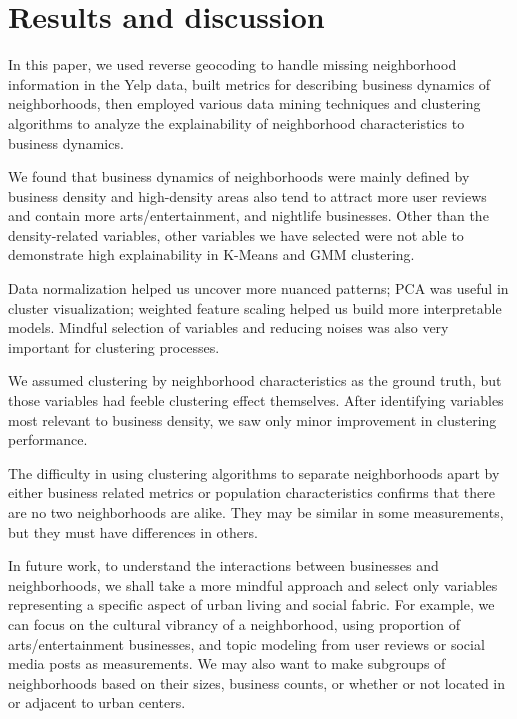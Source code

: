 \documentclass[compsoc]{IEEEtran}
\begin{document}
\section{Results and discussion}

In this paper, we used reverse geocoding to handle missing neighborhood information in the Yelp data, built metrics for describing business dynamics of neighborhoods, then employed various data mining techniques and clustering algorithms to analyze the explainability of neighborhood characteristics to business dynamics.

We found that business dynamics of neighborhoods were mainly defined by business density and high-density areas also tend to attract more user reviews and contain more arts/entertainment, and nightlife businesses. Other than the density-related variables, other variables we have selected were not able to demonstrate high explainability in K-Means and GMM clustering.

Data normalization helped us uncover more nuanced patterns; PCA was useful in cluster visualization; weighted feature scaling helped us build more interpretable models. Mindful selection of variables and reducing noises was also very important for clustering processes.

 We assumed clustering by neighborhood characteristics as the ground truth, but those variables had feeble clustering effect themselves. After identifying variables most relevant to business density, we saw only minor improvement in clustering performance.

The difficulty in using clustering algorithms to separate neighborhoods apart by either business related metrics or population characteristics confirms that there are no two neighborhoods are alike. They may be similar in some measurements, but they must have differences in others.

In future work, to understand the interactions between businesses and neighborhoods, we shall take a more mindful approach and select only variables representing a specific aspect of urban living and social fabric. For example, we can focus on the cultural vibrancy of a neighborhood, using proportion of arts/entertainment businesses, and topic modeling from user reviews or social media posts as measurements. We may also want to make subgroups of neighborhoods based on their sizes, business counts, or whether or not located in or adjacent to urban centers.


\printbibliography[title={References}]
\end{document}
